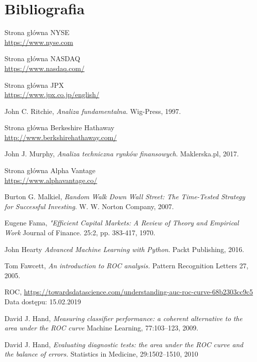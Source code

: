 \documentclass[a4paper, twoside, 11pt, openright]{article}
\begin{document}
\section{Bibliografia}


\begin{thebibliography}{9}
  
Strona główna NYSE
\\\url{https://www.nyse.com}
 
Strona główna NASDAQ
\\\url{https://www.nasdaq.com/}

Strona główna JPX
\\\url{https://www.jpx.co.jp/english/}

  John C. Ritchie,
  \textit{Analiza fundamentalna}.
  Wig-Press,
  1997.
  
Strona główna Berkeshire Hathaway
\\\url{http://www.berkshirehathaway.com/}

  John J. Murphy,
  \textit{Analiza techniczna rynków finansowych}.
  Maklerska.pl,
  2017.

Strona główna Alpha Vantage
\\\url{https://www.alphavantage.co/}

  Burton G. Malkiel,
  \textit{Random Walk Down Wall Street: The Time-Tested Strategy for Successful Investing}.
  W. W. Norton Company,
  2007.

  Eugene Fama,
  \textit{"Efficient Capital Markets: A Review of Theory and Empirical Work}
  Journal of Finance. 25:2, pp. 383-417, 1970.

  John Hearty
  \textit{Advanced Machine Learning with Python}.
  Packt Publishing,
  2016.

	Tom Fawcett, 
  \textit{An introduction to ROC analysis.}
  Pattern Recognition Letters 27,
  2005.

	ROC, \url{https://towardsdatascience.com/understanding-auc-roc-curve-68b2303cc9c5} 
	Data dostępu: 15.02.2019

	David J. Hand, 
  \textit{Measuring classifier performance: a coherent alternative to the area under the ROC curve}
  Machine Learning, 77:103–123, 2009.

	David J. Hand, 
  \textit{Evaluating diagnostic tests: the area under the ROC curve and the balance of errors.}
 Statistics in Medicine, 29:1502–1510, 2010


\end{thebibliography}
\end{document}
